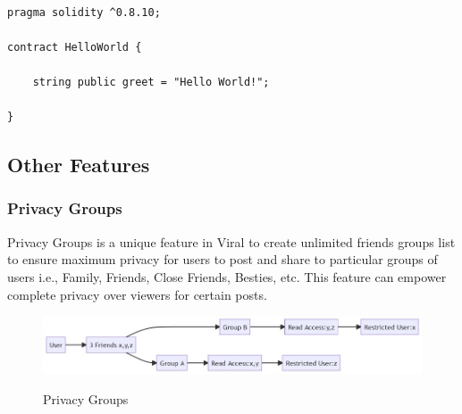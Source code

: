 \documentclass[10pt]{article}
\begin{document}

\begin{lstlisting}[language=Solidity, caption={Tipping Solidity Snippet}]

pragma solidity ^0.8.10;

contract HelloWorld {

    string public greet = "Hello World!";
    
}

\end{lstlisting}

\subsection{Other Features}

\subsubsection{Privacy Groups}

Privacy Groups is a unique feature in Viral to create unlimited friend\textsc{}s groups list to ensure maximum privacy for users to post and share to particular groups of users i.e., Family, Friends, Close Friends, Besties, etc. This feature can empower complete privacy over viewers for certain posts.\\

\begin{figure}[H]
\includegraphics[width=\textwidth]{privacygroups}\\
\caption{Privacy Groups}
\end{figure}
\end{document}
